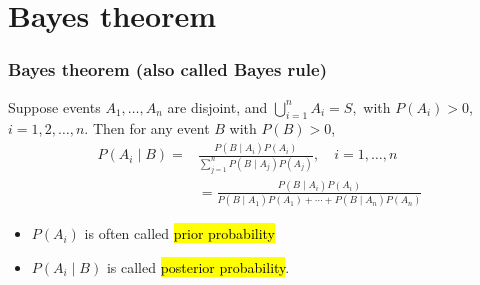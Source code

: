 \documentclass[slidestop,compress,mathserif]{beamer}
\begin{document}



%
%
%
%

\section{Bayes theorem}
\begin{frame}\frametitle{Bayes theorem (also called Bayes rule)}

Suppose events $A_1,\ldots,A_n$  are  disjoint, and
$\bigcup_{i=1}^n A_i = S,$
with $P(A_i) > 0$, $i = 1, 2, \ldots, n$.
Then for any event $B$ with $P(B) > 0$, \pause
\begin{align*}
P(A_i \mid B) = & \frac{P(B \mid A_i)P(A_i)}{\sum\limits_{j = 1}^n P(B \mid A_j)P(A_j)},
\quad i = 1, \ldots, n \\
& = \frac{P(B \mid A_i)P(A_i)}{P(B \mid A_1)P(A_1)+ \cdots + P(B \mid A_n)P(A_n)}
\end{align*}
\pause
\begin{itemize}
\item $P(A_i)$ is often called \hl{prior probability}
\item $P(A_i \mid B)$ is called \hl{posterior probability}.
\end{itemize}

\end{frame}
\end{document}
